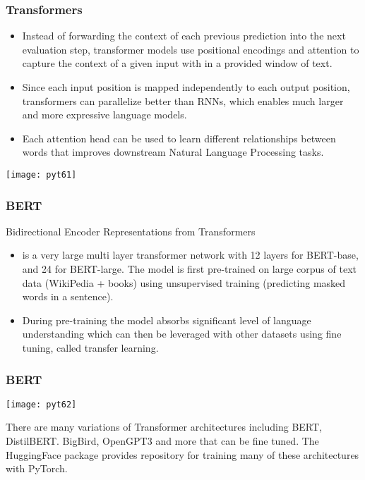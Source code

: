 \begin{frame}[fragile] \frametitle{Transformers}


\begin{itemize}
\item Instead of forwarding the context of each previous prediction into the next evaluation step, transformer models use positional encodings and attention to capture the context of a given input with in a provided window of text.
\item Since each input position is mapped independently to each output position, transformers can parallelize better than RNNs, which enables much larger and more expressive language models. 
\item Each attention head can be used to learn different relationships between words that improves downstream Natural Language Processing tasks.
\end{itemize}

\begin{center}
\texttt{[image: pyt61]}
\end{center}
\end{frame}

\begin{frame}[fragile] \frametitle{BERT}

Bidirectional Encoder Representations from Transformers

\begin{itemize}
\item is a very large multi layer transformer network with 12 layers for BERT-base, and 24 for BERT-large. The model is first pre-trained on large corpus of text data (WikiPedia + books) using unsupervised training (predicting masked words in a sentence). 
\item During pre-training the model absorbs significant level of language understanding which can then be leveraged with other datasets using fine tuning, called transfer learning.
\end{itemize}

\end{frame}

\begin{frame}[fragile] \frametitle{BERT}

\begin{center}
\texttt{[image: pyt62]}
\end{center}

There are many variations of Transformer architectures including BERT, DistilBERT. BigBird, OpenGPT3 and more that can be fine tuned. The HuggingFace package provides repository for training many of these architectures with PyTorch.
\end{frame}

